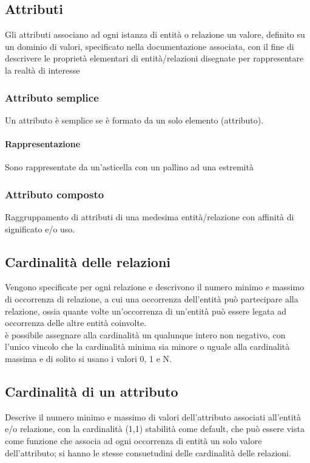 \documentclass[12pt, a4paper, openany]{book}
\begin{document}
\subsection{Attributi}
Gli attributi associano ad ogni istanza di entità o relazione un valore, definito su un dominio di valori, specificato nella documentazione associata, con il fine di descrivere le proprietà elementari di entità/relazioni disegnate per rappresentare la realtà di interesse
\subsubsection*{Attributo semplice}
Un attributo è semplice se è formato da un solo elemento (attributo).
\paragraph{Rappresentazione} Sono rappresentate da un'asticella con un pallino ad una estremità

\subsubsection*{Attributo composto}
Raggruppamento di attributi di una medesima entità/relazione con affinità di significato e/o uso.

\subsection{Cardinalità delle relazioni}
Vengono specificate per ogni relazione e descrivono il numero minimo e massimo di occorrenza di relazione, a cui una occorrenza dell'entità può partecipare alla relazione, ossia quante volte un'occorrenza di un'entità può essere legata ad occorrenza delle altre entità coinvolte.
\\è possibile assegnare alla cardinalità un qualunque intero non negativo, con l'unico vincolo che la cardinalità minima sia minore o uguale alla cardinalità massima e di solito si usano i valori 0, 1 e N.

\subsection{Cardinalità di un attributo}
Descrive il numero minimo e massimo di valori dell'attributo associati all'entità e/o relazione, con la cardinalità (1,1) stabilità come default, che può essere vista come funzione che associa ad ogni occorrenza di entità un solo valore dell'attributo; si hanno le stesse consuetudini delle cardinalità delle relazioni.
\end{document}
